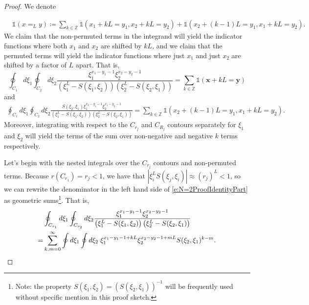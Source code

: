 \documentclass[a4paper,11pt]{article}
\theoremstyle{definition}
\begin{document}
    
\begin{proof}
We denote


\begin{equation}
\begin{split}
    &\mathds{1}(x=_L y) \coloneq \sum_{k\in\mathbb{Z}}\mathds{1}\left(x_1+kL=y_1,x_2+kL=y_2 \right) + \mathds{1}\left(x_2+(k-1)L=y_1,x_1+kL=y_2 \right).
\end{split}
\end{equation}
We claim that the non-permuted terms in the integrand will yield the indicator functions where both $x_1$ and $x_2$ are shifted by $kL$, and we claim that the permuted terms will yield the indicator functions where just $x_1$ and just $x_2$ are shifted by a factor of $L$ apart. That is,   
\begin{equation}\label{e:N=2ProofIdentityPart}
    \oint_{C_1}d\xi_1\oint_{C_2}d\xi_2 \frac{\xi_1^{x_1-y_1-1}\xi_2^{x_2-y_2-1}}{\left(\xi_1^L - S(\xi_1,\xi_2) \right)\left(\xi_2^L - S(\xi_2,\xi_1) \right)} = \sum_{k\in\mathbb{Z}}\mathds{1}(\mathbf{x}+kL=\mathbf{y})
\end{equation}
and 
\begin{equation}\begin{split}
    \oint_{C_1}d\xi_1\oint_{C_2}d\xi_2 \frac{S(\xi_2,\xi_1)\xi_1^{x_2-y_1-1}\xi_2^{x_1-y_2-1}}{\left(\xi_1^L - S(\xi_1,\xi_2) \right)\left(\xi_2^L - S(\xi_2,\xi_1) \right)} = \sum_{k\in\mathbb{Z}}\mathds{1}\left(x_2+(k-1)L=y_1,x_1+kL=y_2 \right).
    \end{split}
\end{equation}
Moreover, integrating with respect to the $C_{r_j}$ and $C_{R_j}$ contours separately for $\xi_1$ and $\xi_2$ will yield the terms of the sum over non-negative and negative $k$ terms respectively. 

Let's begin with the nested integrals over the $C_{r_j}$ contours and non-permuted terms. Because $r(C_{r_1})=r_j<1$, we have that $\left|\xi_i^L S(\xi_j,\xi_i) \right| \approx (r_j)^L<1$, so we can rewrite the denominator in the left hand side of \eqref{e:N=2ProofIdentityPart} as geometric sums\footnote{Note: the property $S(\xi_1,\xi_2)=(S(\xi_2,\xi_1))^{-1}$ will be frequently used without specific mention in this proof sketch.}. That is, 
\begin{equation}\label{e:N=2proofGeometricSum}
\begin{split}
    &\oint_{C_{r_1}}d\xi_1\oint_{C_{r_2}}d\xi_2 \frac{\xi_1^{x_1-y_1-1}\xi_2^{x_2-y_2-1}}{\left(\xi_1^L - S(\xi_1,\xi_2) \right)\left(\xi_2^L - S(\xi_2,\xi_1) \right)}\\ = &\sum_{k,m=0}^\infty \oint d\xi_1\oint d\xi_2\hspace{0.1cm}\xi_1^{x_1-y_1-1+kL}\xi_2^{x_2-y_2-1+mL}S(\xi_2,\xi_1)^{k-m}.
\end{split}
\end{equation}


\end{proof}
\end{document}
